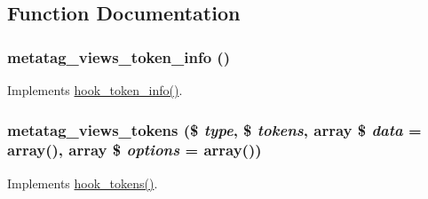 \subsection{Function Documentation}
\hypertarget{metatag__views_8tokens_8inc_a8e88403fb36cbef254723b3c734d1cc0}{
\subsubsection[{metatag\_\-views\_\-token\_\-info}]{\setlength{\rightskip}{0pt plus 5cm}metatag\_\-views\_\-token\_\-info ()}}
\label{metatag__views_8tokens_8inc_a8e88403fb36cbef254723b3c734d1cc0}
Implements \hyperlink{group__hooks_gab868597197cf36911f95dcd29ae0b954}{hook\_\-token\_\-info()}. \hypertarget{metatag__views_8tokens_8inc_a1c0a87f4f1fc2e98bebe62e909b4affa}{
\subsubsection[{metatag\_\-views\_\-tokens}]{\setlength{\rightskip}{0pt plus 5cm}metatag\_\-views\_\-tokens (\$ {\em type}, \/  \$ {\em tokens}, \/  array \$ {\em data} = {\ttfamily array()}, \/  array \$ {\em options} = {\ttfamily array()})}}
\label{metatag__views_8tokens_8inc_a1c0a87f4f1fc2e98bebe62e909b4affa}
Implements \hyperlink{group__hooks_ga3bfd87d9a19b2397b0f970e1cff7ea4f}{hook\_\-tokens()}. 